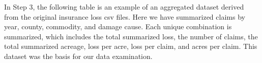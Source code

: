 \documentclass[]{article}
\newenvironment{Shaded}{\begin{snugshade}}{\end{snugshade}}
\newcommand{\DataTypeTok}[1]{\textcolor[rgb]{0.13,0.29,0.53}{#1}}
\newcommand{\DecValTok}[1]{\textcolor[rgb]{0.00,0.00,0.81}{#1}}
\newcommand{\KeywordTok}[1]{\textcolor[rgb]{0.13,0.29,0.53}{\textbf{#1}}}
\newcommand{\NormalTok}[1]{#1}
\newcommand{\OperatorTok}[1]{\textcolor[rgb]{0.81,0.36,0.00}{\textbf{#1}}}
\newcommand{\StringTok}[1]{\textcolor[rgb]{0.31,0.60,0.02}{#1}}
\begin{document}
In Step 3, the following table is an example of an aggregated dataset
derived from the original insurance loss csv files. Here we have
summarized claims by year, county, commodity, and damage cause. Each
unique combination is summarized, which includes the total summarized
loss, the number of claims, the total summarized acreage, loss per acre,
loss per claim, and acres per claim. This dataset was the basis for our
data examination.

\begin{Shaded}
\end{Shaded}
\end{document}
